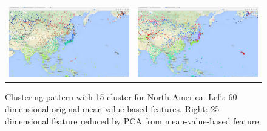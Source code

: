 \begin{figure}[H]
    \centering
    \begin{tabular}{c c}
        \includegraphics[width=.4\linewidth]{./figure/Ave_25_comp_15_clu_Asia.png}
        & \includegraphics[width=.4\linewidth]{./figure/Ave_60_comp_15_clu_Asia.png}
    \end{tabular}
    \caption{Clustering pattern with 15 cluster for North America. Left: 60 dimensional original mean-value based features. Right: 25 dimensional feature reduced by PCA from mean-value-based feature.}
    \label{fig:PCA}
\end{figure}


